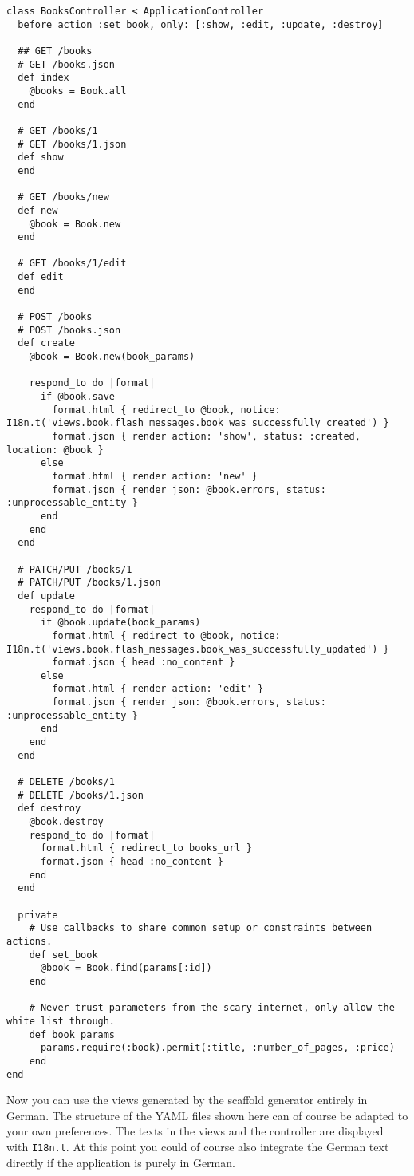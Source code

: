 \documentclass[a4paper]{book}
\begin{document}
\begin{shaded}\begin{verbatim}
class BooksController < ApplicationController
  before_action :set_book, only: [:show, :edit, :update, :destroy]

  ## GET /books
  # GET /books.json
  def index
    @books = Book.all
  end

  # GET /books/1
  # GET /books/1.json
  def show
  end

  # GET /books/new
  def new
    @book = Book.new
  end

  # GET /books/1/edit
  def edit
  end

  # POST /books
  # POST /books.json
  def create
    @book = Book.new(book_params)

    respond_to do |format|
      if @book.save
        format.html { redirect_to @book, notice: I18n.t('views.book.flash_messages.book_was_successfully_created') }
        format.json { render action: 'show', status: :created, location: @book }
      else
        format.html { render action: 'new' }
        format.json { render json: @book.errors, status: :unprocessable_entity }
      end
    end
  end

  # PATCH/PUT /books/1
  # PATCH/PUT /books/1.json
  def update
    respond_to do |format|
      if @book.update(book_params)
        format.html { redirect_to @book, notice: I18n.t('views.book.flash_messages.book_was_successfully_updated') }
        format.json { head :no_content }
      else
        format.html { render action: 'edit' }
        format.json { render json: @book.errors, status: :unprocessable_entity }
      end
    end
  end

  # DELETE /books/1
  # DELETE /books/1.json
  def destroy
    @book.destroy
    respond_to do |format|
      format.html { redirect_to books_url }
      format.json { head :no_content }
    end
  end

  private
    # Use callbacks to share common setup or constraints between actions.
    def set_book
      @book = Book.find(params[:id])
    end

    # Never trust parameters from the scary internet, only allow the white list through.
    def book_params
      params.require(:book).permit(:title, :number_of_pages, :price)
    end
end
\end{verbatim}\end{shaded}

Now you can use the views generated by the scaffold generator entirely in German. The structure of the YAML files shown here can of course be adapted to your own preferences. The texts in the views and the controller are displayed with \texttt{I18n.t}. At this point you could of course also integrate the German text directly if the application is purely in German.
\end{document}
